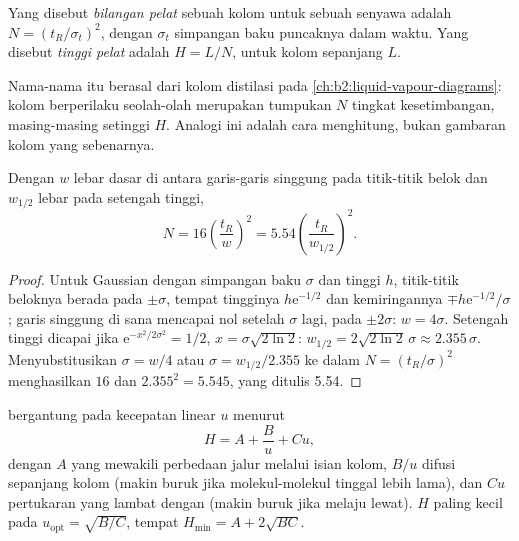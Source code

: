 \begin{definition}\label{def:b2:chromatography:plates}
Yang disebut \emph{bilangan pelat} sebuah kolom untuk
sebuah senyawa adalah $N = (t_R/\sigma_t)^2$, dengan
$\sigma_t$ simpangan baku puncaknya dalam waktu. Yang disebut \emph{tinggi
pelat} adalah
$H = L/N$, untuk kolom sepanjang $L$.
\end{definition}

Nama-nama itu berasal dari kolom distilasi pada \cref{ch:b2:liquid-vapour-diagrams}:
kolom  berperilaku seolah-olah merupakan tumpukan $N$ tingkat
kesetimbangan, masing-masing setinggi $H$. Analogi ini adalah cara
menghitung, bukan gambaran kolom yang sebenarnya.

\begin{proposition}\label{prop:b2:chromatography:plate-number}
Dengan $w$ lebar dasar di antara garis-garis singgung pada titik-titik belok
dan $w_{1/2}$ lebar pada
setengah tinggi,
\begin{equation*}
N = 16\left(\frac{t_R}{w}\right)^2 = 5.54\left(\frac{t_R}{w_{1/2}}\right)^2.
\end{equation*}
\end{proposition}

\begin{proof}
Untuk Gaussian dengan simpangan baku $\sigma$ dan tinggi $h$, titik-titik
beloknya berada pada $\pm\sigma$,
tempat tingginya $h\mathrm e^{-1/2}$ dan kemiringannya $\mp h\mathrm e^{-1/2}/\sigma$;
garis singgung di sana mencapai nol setelah $\sigma$ lagi, pada $\pm2\sigma$: $w = 4\sigma$.
Setengah tinggi dicapai jika
$\mathrm e^{-x^2/2\sigma^2} = 1/2$, $x = \sigma\sqrt{2\ln2}$: $w_{1/2} = 2\sqrt{2\ln2}\,\sigma \approx
2.355\,\sigma$. Menyubstitusikan $\sigma = w/4$ atau $\sigma = w_{1/2}/2.355$ ke dalam $N = (t_R/\sigma)^2$
menghasilkan
$16$ dan $2.355^2 = 5.545$, yang ditulis 5.54.
\end{proof}

\begin{proposition}\label{prop:b2:chromatography:van-deemter}
 bergantung pada kecepatan linear $u$  menurut
\begin{equation*}
H = A + \frac{B}{u} + Cu,
\end{equation*}
dengan $A$ yang mewakili perbedaan jalur melalui isian kolom, $B/u$ difusi
sepanjang kolom (makin buruk jika molekul-molekul tinggal lebih lama), dan
$Cu$ pertukaran yang lambat dengan  (makin buruk jika 
melaju lewat). $H$ paling kecil pada $u_{\mathrm{opt}} = \sqrt{B/C}$, tempat $H_{\min} =
A + 2\sqrt{BC}$.
\end{proposition}

